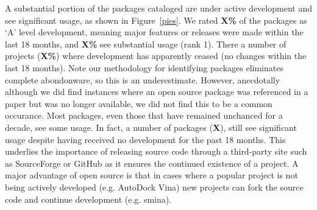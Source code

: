 A substantial portion of the packages cataloged are under active development and see significant usage, as shown in Figure~\ref{pies}.  We rated \textbf{X\%} of the packages as `A' level development, meaning major features or releases were made within the last 18 months, and \textbf{X\%} see substantial usage (rank 1).  
There a number of projects (\textbf{X\%}) where development has apparently ceased (no changes within the last 18 months). Note our methodology for identifying packages eliminates complete abondonware, so this is an underestimate.  However, anecdotally although we did find instances where an open source package was referenced in a paper but was no longer available, we did not find this to be a common occurance.  Most packages, even those that have remained unchanced for a decade, see some usage.  In fact, a number of packages (\textbf{X}), still see significant usage despite having received no development for the past 18 months.  This underlies the importance of releasing source code through a third-party site such as SourceForge or GitHub as it ensures the continued existence of a project.  A major advantage of open source is that in cases where a popular project is not being actively developed (e.g. AutoDock Vina) new projects can fork the source code and continue development (e.g. smina).
